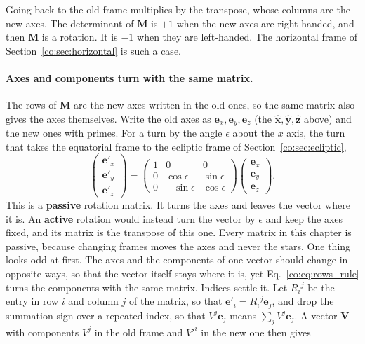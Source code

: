 Going back to the old frame multiplies by the transpose, whose columns are the new axes. The determinant of $\mathbf M$ is $+1$ when the new axes are right-handed, and then $\mathbf M$ is a rotation. It is $-1$ when they are left-handed. The horizontal frame of Section~\ref{co:sec:horizontal} is such a case.

\paragraph{Axes and components turn with the same matrix.} The rows of $\mathbf M$ are the new axes written in the old ones, so the same matrix also gives the axes themselves. Write the old axes as $\mathbf e_x,\mathbf e_y,\mathbf e_z$ (the $\hat{\mathbf x},\hat{\mathbf y},\hat{\mathbf z}$ above) and the new ones with primes. For a turn by the angle $\epsilon$ about the $x$ axis, the turn that takes the equatorial frame to the ecliptic frame of Section~\ref{co:sec:ecliptic},
\[
\begin{pmatrix}
\mathbf e'_x\\
\mathbf e'_y\\
\mathbf e'_z
\end{pmatrix}
=
\begin{pmatrix}
1&0&0\\
0&\cos\epsilon&\sin\epsilon\\
0&-\sin\epsilon&\cos\epsilon
\end{pmatrix}
\begin{pmatrix}
\mathbf e_x\\
\mathbf e_y\\
\mathbf e_z
\end{pmatrix}.
\]
This is a \textbf{passive} rotation matrix. It turns the axes and leaves the vector where it is. An \textbf{active} rotation would instead turn the vector by $\epsilon$ and keep the axes fixed, and its matrix is the transpose of this one. Every matrix in this chapter is passive, because changing frames moves the axes and never the stars. One thing looks odd at first. The axes and the components of one vector should change in opposite ways, so that the vector itself stays where it is, yet Eq.~\eqref{co:eq:rows_rule} turns the components with the same matrix. Indices settle it. Let $R_i{}^j$ be the entry in row $i$ and column $j$ of the matrix, so that $\mathbf e'_i=R_i{}^j\mathbf e_j$, and drop the summation sign over a repeated index, so that $V^j\mathbf e_j$ means $\sum_jV^j\mathbf e_j$. A vector $\mathbf V$ with components $V^j$ in the old frame and $V'^i$ in the new one then gives
